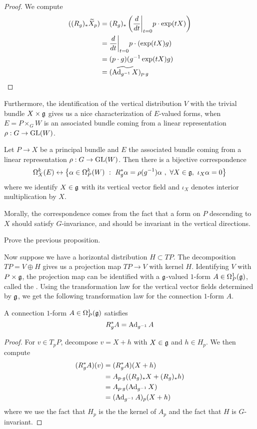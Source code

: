 %
\begin{proof}
We compute
\begin{align*}
((R_g)_*\widetilde{X}_p)
&= (R_g)_*\left(\frac{d}{dt}\bigg\vert_{t=0}p\cdot\exp(tX)\right) \\
&= \frac{d}{dt}\bigg\vert_{t=0}p\cdot(\exp(tX)g) \\
&= (p\cdot g)(g^{-1}\exp(tX)g) \\
&= (\widetilde{\operatorname{Ad}_{g^{-1}}X})_{p\cdot g}
\end{align*}
\end{proof}
%
Furthermore, the identification of the vertical distribution $V$ with the trivial
bundle $X \times \mathfrak{g}$ gives us a nice characterization of $E$-valued forms,
when $E = P\times_G W$ is an associated bundle coming from a linear representation
$\rho : G \to \mathrm{GL}(W)$.
%
\begin{prop}
Let $P \to X$ be a principal bundle and $E$ the associated bundle coming from
a linear representation $\rho : G \to \mathrm{GL}(W)$. Then there is a bijective
correspondence
\[
\Omega^k_X(E) \leftrightarrow \left\lbrace \alpha \in \Omega^k_P(W) ~:~ R^*_g\alpha =
\rho(g^{-1})\alpha~,~\forall X \in \mathfrak{g}, ~\iota_X\alpha = 0 \right\rbrace
\]
where we identify $X \in \mathfrak{g}$ with its vertical vector field and
$\iota_X$ denotes interior multiplication by $X$.
\end{prop}
%
Morally, the correspondence comes from the fact that a form on $P$ descending
to $X$ should satisfy $G$-invariance, and should be invariant in the vertical
directions.
%
\begin{exer}
Prove the previous proposition.
\end{exer}
%
Now suppose we have a horizontal distribution $H \subset TP$. The decomposition
$TP = V \oplus H$ gives us a projection map $TP \to V$ with kernel $H$.
Identifying $V$ with $P \times \mathfrak{g}$, the projection map can be identified with
a $\mathfrak{g}$-valued $1$-form $A \in \Omega^1_P(\mathfrak{g})$, called the
. Using the transformation law for the vertical
vector fields determined by $\mathfrak{g}$, we get the following transformation law
for the connection $1$-form $A$.
%
\begin{prop}
A connection $1$-form $A \in \Omega^1_P(\mathfrak{g})$ satisfies
\[
R^*_gA = \operatorname{Ad}_{g^{-1}}A
\]
\end{prop}
%
\begin{proof}
For $v \in T_pP$, decompose $v = X + h$ with $X \in \mathfrak{g}$ and $h \in H_p$.
We then compute
\begin{align*}
(R_g^*A)(v) &= (R^*_gA)(X + h) \\
&= A_{p\cdot g}((R_g)_*X + (R_g)_*h) \\
&= A_{p\cdot g}(\operatorname{Ad}_{g^{-1}} X) \\
&= (\operatorname{Ad}_{g^{-1}}A)_p(X+h)
\end{align*}
where we use the fact that $H_p$ is the the kernel of $A_p$ and the fact that $H$
is $G$-invariant.
\end{proof}
